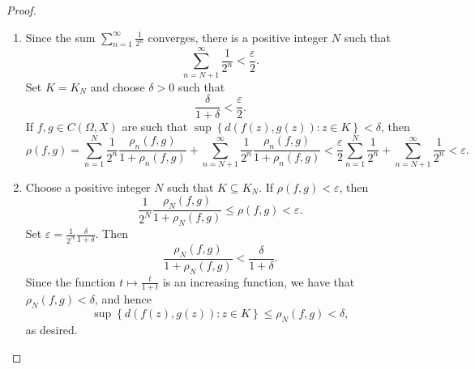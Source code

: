 \documentclass[11pt]{article}
\theoremstyle{thmstyle}
\theoremstyle{defstyle}
\renewcommand{\le}{\leqslant}
\begin{document}
\begin{proof}
\begin{enumerate}[label=(\arabic*)]
    \item Since the sum $\displaystyle\sum_{n = 1}^\infty\frac{1}{2^n}$ converges, there is a positive integer $N$ such that 
    \begin{equation*}
        \sum_{n = N + 1}^\infty\frac{1}{2^n} < \frac{\varepsilon}{2}.
    \end{equation*}
    Set $K = K_N$ and choose $\delta > 0$ such that 
    \begin{equation*}
        \frac{\delta}{1 + \delta} < \frac{\varepsilon}{2}.
    \end{equation*}
    If $f, g\in C(\Omega, X)$ are such that $\sup\left\{d(f(z), g(z)) \colon z\in K\right\} < \delta$, then 
    \begin{equation*}
        \rho(f, g) = \sum_{n = 1}^N\frac{1}{2^n}\frac{\rho_n(f, g)}{1 + \rho_n(f, g)} + \sum_{n = N + 1}^\infty\frac{1}{2^n}\frac{\rho_n(f, g)}{1 + \rho_n(f, g)} < \frac{\varepsilon}{2}\sum_{n = 1}^N\frac{1}{2^n} + \sum_{n = N + 1}^\infty\frac{1}{2^n} < \varepsilon.
    \end{equation*}

    \item Choose a positive integer $N$ such that $K\subseteq K_N$. If $\rho(f, g) < \varepsilon$, then 
    \begin{equation*}
        \frac{1}{2^N}\frac{\rho_N(f, g)}{1 + \rho_N(f, g)}\le\rho(f, g) < \varepsilon.
    \end{equation*}
    Set $\varepsilon = \frac{1}{2^N}\frac{\delta}{1 + \delta}$. Then 
    \begin{equation*}
        \frac{\rho_N(f, g)}{1 + \rho_N(f, g)} < \frac{\delta}{1 + \delta}.
    \end{equation*}
    Since the function $t\mapsto\frac{t}{1 + t}$ is an increasing function, we have that $\rho_N(f, g) < \delta$, and hence 
    \begin{equation*}
        \sup\left\{d(f(z), g(z))\colon z\in K\right\}\le\rho_N(f, g) < \delta,
    \end{equation*}
    as desired. \qedhere
\end{enumerate}
\end{proof}
\end{document}
